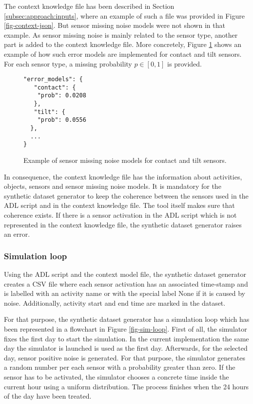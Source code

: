 The context knowledge file has been described in Section \ref{subsec:approach:inputs}, where an example of such a file was provided in Figure \ref{fig-context-json}. But sensor missing noise models were not shown in that example. As sensor missing noise is mainly related to the sensor type, another part is added to the context knowledge file. More concretely, Figure \ref{fig-missing-noise} shows an example of how such error models are implemented for contact and tilt sensors. For each sensor type, a missing probability $p \in [0, 1]$ is provided. 

\begin{figure}[htbp]
\begin{small}
\begin{lstlisting}
"error_models": {
   "contact": {
	"prob": 0.0208
   },
   "tilt": {
	"prob": 0.0556
  },
  ...
}
\end{lstlisting}
\end{small}
\caption{Example of sensor missing noise models for contact and tilt sensors.}
\label{fig-missing-noise}
\end{figure}

In consequence, the context knowledge file has the information about activities, objects, sensors and sensor missing noise models. It is mandatory for the synthetic dataset generator to keep the coherence between the sensors used in the ADL script and in the context knowledge file. The tool itself makes sure that coherence exists. If there is a sensor activation in the ADL script which is not represented in the context knowledge file, the synthetic dataset generator raises an error.

\subsubsection*{Simulation loop}

Using the ADL script and the context model file, the synthetic dataset generator creates a CSV file where each sensor activation has an associated time-stamp and is labelled with an activity name or with the special label None if it is caused by noise. Additionally, activity start and end time are marked in the dataset.

For that purpose, the synthetic dataset generator has a simulation loop which has been represented in a flowchart in Figure \ref{fig-sim-loop}. First of all, the simulator fixes the first day to start the simulation. In the current implementation the same day the simulator is launched is used as the first day. Afterwards, for the selected day, sensor positive noise is generated. For that purpose, the simulator generates a random number per each sensor with a probability greater than zero. If the sensor has to be activated, the simulator chooses a concrete time inside the current hour using a uniform distribution. The process finishes when the 24 hours of the day have been treated.

